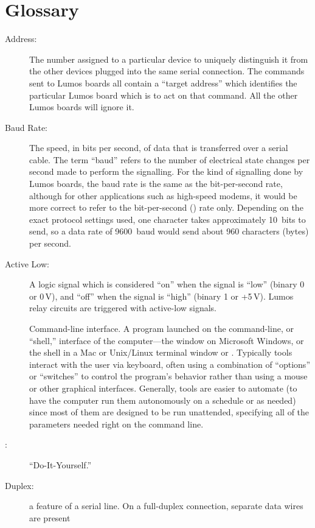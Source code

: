 \documentclass[letterpaper,twoside,onecolumn,openright,final]{memoir}
\begin{document}
\chapter{Glossary}\label{ch:glossary}
\begin{description}
	\item[Address:]
		The  number assigned to a particular device to uniquely distinguish it from the other
		devices plugged into the same serial connection.  The commands sent to Lumos boards all contain
		a ``target address'' which identifies the particular Lumos board which is to act on that command.
		All the other Lumos boards will ignore it.
	\item[Baud Rate:]
		The speed, in bits per second, of data that is transferred over a serial cable.  The term
		``baud'' refers to the number of electrical state changes per second made to perform the signalling.
		For the kind of signalling done by Lumos boards, the baud rate is the same as the bit-per-second rate,
		although for other applications such as high-speed modems, it would be more correct to refer to the
		bit-per-second () rate only.  Depending on the exact protocol settings used, one character
		takes approximately 10~bits to send, so a data rate of 9600~baud would send about 960 characters (bytes)
		per second.
	\item[Active Low:]
		A logic signal which is considered ``on'' when the signal is ``low'' (binary 0 or 0\,V),
		and ``off'' when the signal is ``high'' (binary 1 or +5\,V).  Lumos relay circuits are 
		triggered with active-low signals.
	\item[]
		Command-line interface.  A program launched on the command-line, or ``shell,'' interface of the computer---the
		 window on Microsoft Windows, or the shell in a Mac  or Unix/Linux terminal window or
		.  Typically  tools interact with the user via keyboard, often using a combination of
		``options'' or ``switches'' to control the program's behavior rather than using a mouse or other graphical
		interfaces.  Generally,  tools are easier to automate (to have the computer run them autonomously
		on a schedule or as needed) since most of them are designed to be run unattended, specifying all of the parameters needed right on the command line.
	\item[:] ``Do-It-Yourself.''
	\item[Duplex:]
		a feature of a serial line.  On a full-duplex connection, separate data wires are present

\end{description}
\end{document}
